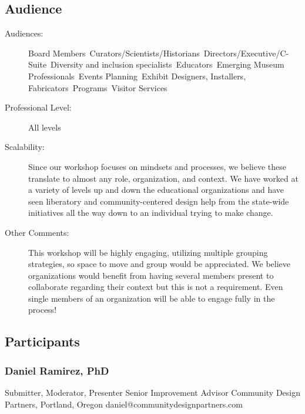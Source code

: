 \documentclass{report}
\begin{document}
\begin{description}
                \end{description}
              \subsection*{Audience}
                \begin{description}
                  \item [Audiences:]Board Members~Curators/Scientists/Historians~Directors/Executive/C-Suite~Diversity and inclusion specialists~Educators~Emerging Museum Professionals~Events Planning~Exhibit Designers, Installers, Fabricators~Programs~Visitor Services~
                  \item[Professional Level:]All levels~
                \item[Scalability:] Since our workshop focuses on mindsets and processes, we believe these translate to almost any role, organization, and context. We have worked at a variety of levels up and down the educational organizations and have seen liberatory and community-centered design help from the state-wide initiatives all the way down to an individual trying to make change.

							
              \item[Other Comments:] This workshop will be highly engaging, utilizing multiple grouping strategies, so space to move and group would be appreciated. We believe organizations would benefit from having several members present to collaborate regarding their context but this is not a requirement. Even single members of an organization will be able to engage fully in the process!
              \end{description}
            \subsection*{Participants}
              \subsubsection*{ Daniel Ramirez, PhD }
              Submitter, Moderator, Presenter\newline
              Senior Improvement Advisor\newline
              Community Design Partners, Portland, Oregon
              \newline
              daniel@communitydesignpartners.com\newline
              
\end{document}

